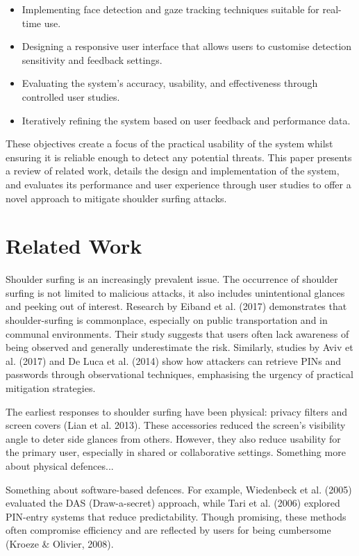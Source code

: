 \documentclass[12pt]{article}
\theoremstyle{plain}
\theoremstyle{definition}
\begin{document}
\begin{itemize}
  \item Implementing face detection and gaze tracking techniques suitable for real-time use.
  \item Designing a responsive user interface that allows users to customise detection sensitivity and feedback settings.
  \item Evaluating the system’s accuracy, usability, and effectiveness through controlled user studies.
  \item Iteratively refining the system based on user feedback and performance data.
\end{itemize}

These objectives create a focus of the practical usability of the system whilst ensuring it is reliable enough to detect any potential threats. This paper presents a review of related work, details the design and implementation of the system, and evaluates its performance and user experience through user studies to offer a novel approach to mitigate shoulder surfing attacks.

\section{Related Work}
\label{sec:Related Work} 

Shoulder surfing is an increasingly prevalent issue. The occurrence of shoulder surfing is not limited to malicious attacks, it also includes unintentional glances and peeking out of interest. Research by Eiband et al. (2017) demonstrates that shoulder-surfing is commonplace, especially on public transportation and in communal environments. Their study suggests that users often lack awareness of being observed and generally underestimate the risk. Similarly, studies by Aviv et al. (2017) and De Luca et al. (2014) show how attackers can retrieve PINs and passwords through observational techniques, emphasising the urgency of practical mitigation strategies.

The earliest responses to shoulder surfing have been physical: privacy filters and screen covers (Lian et al. 2013). These accessories reduced the screen’s visibility angle to deter side glances from others. However, they also reduce usability for the primary user, especially in shared or collaborative settings. Something more about physical defences... 

Something about software-based defences. For example, Wiedenbeck et al. (2005) evaluated the DAS (Draw-a-secret) approach, while Tari et al. (2006) explored PIN-entry systems that reduce predictability. Though promising, these methods often compromise efficiency and are reflected by users for being cumbersome (Kroeze & Olivier, 2008).
\end{document}
